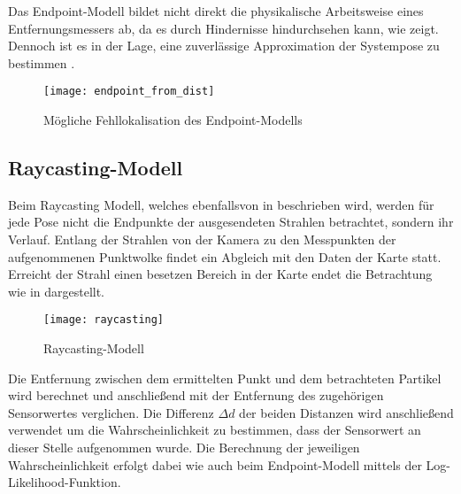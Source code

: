 Das Endpoint-Modell bildet nicht direkt die physikalische Arbeitsweise eines Entfernungsmessers ab, da es durch Hindernisse \glqq hindurchsehen\grqq{} kann, wie  zeigt. Dennoch ist es in der Lage, eine zuverlässige Approximation der Systempose zu bestimmen \cite{Konolige1999}.\\


\begin{figure}[!ht]
	\begin{center}
		\texttt{[image: endpoint\_from\_dist]}
		\caption{Mögliche Fehllokalisation des Endpoint-Modells}
		\label{fig.endpoint}
	\end{center}
\end{figure}

\subsection{Raycasting-Modell}
Beim Raycasting Modell, welches ebenfalls von \red[X] in \cite{Raycasting} beschrieben wird, werden für jede Pose nicht die Endpunkte der ausgesendeten Strahlen betrachtet, sondern ihr Verlauf. Entlang der Strahlen von der Kamera zu den Messpunkten der aufgenommenen Punktwolke findet ein Abgleich mit den Daten der Karte statt. Erreicht der Strahl einen besetzen Bereich in der Karte endet die Betrachtung wie in  dargestellt.\\

\begin{figure}[!ht]
	\begin{center}
		\texttt{[image: raycasting]}
		\caption{Raycasting-Modell}
		\label{fig.raycast}
	\end{center}
\end{figure}

Die Entfernung zwischen dem ermittelten Punkt und dem betrachteten Partikel wird berechnet und anschließend mit der Entfernung des zugehörigen Sensorwertes verglichen. Die Differenz $\Delta d$ der beiden Distanzen wird anschließend verwendet um die Wahrscheinlichkeit zu bestimmen, dass der Sensorwert an dieser Stelle aufgenommen wurde. Die Berechnung der jeweiligen Wahrscheinlichkeit erfolgt dabei wie auch beim Endpoint-Modell mittels der Log-Likelihood-Funktion.\\

